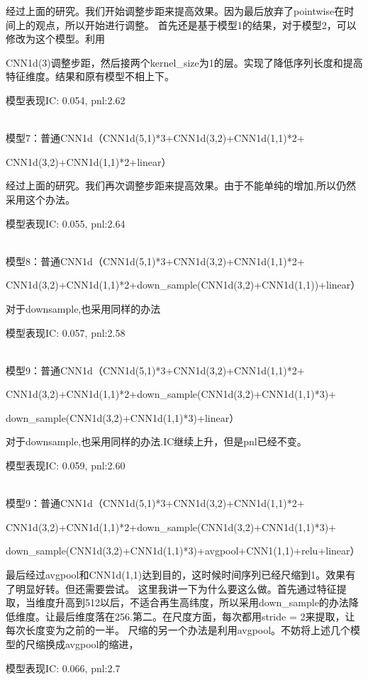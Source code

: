 \documentclass[11pt]{ctexart}
\begin{document}
经过上面的研究。我们开始调整步距来提高效果。因为最后放弃了pointwise在时间上的观点，所以开始进行调整。
首先还是基于模型1的结果，对于模型2，可以修改为这个模型。利用  \par CNN1d(3)调整步距，然后接两个kernel\_size为1的层。实现了降低序列长度和提高特征维度。结果和原有模型不相上下。

模型表现{\kaishu \small IC: 0.054, pnl:2.62}

~\\
模型7：普通CNN1d（CNN1d(5,1)*3+CNN1d(3,2)+CNN1d(1,1)*2+

CNN1d(3,2)+CNN1d(1,1)*2+linear）

经过上面的研究。我们再次调整步距来提高效果。由于不能单纯的增加,所以仍然采用这个办法。

模型表现{\kaishu \small IC: 0.055, pnl:2.64}


~\\
模型8：普通CNN1d（CNN1d(5,1)*3+CNN1d(3,2)+CNN1d(1,1)*2+

CNN1d(3,2)+CNN1d(1,1)*2+down\_sample(CNN1d(3,2)+CNN1d(1,1))+linear）

对于downsample,也采用同样的办法

模型表现{\kaishu \small IC: 0.057, pnl:2.58}


~\\
模型9：普通CNN1d（CNN1d(5,1)*3+CNN1d(3,2)+CNN1d(1,1)*2+

CNN1d(3,2)+CNN1d(1,1)*2+down\_sample(CNN1d(3,2)+CNN1d(1,1)*3)+

down\_sample(CNN1d(3,2)+CNN1d(1,1)*3)+linear）

对于downsample,也采用同样的办法.IC继续上升，但是pnl已经不变。

模型表现{\kaishu \small IC: 0.059, pnl:2.60}


~\\
模型9：普通CNN1d（CNN1d(5,1)*3+CNN1d(3,2)+CNN1d(1,1)*2+

CNN1d(3,2)+CNN1d(1,1)*2+down\_sample(CNN1d(3,2)+CNN1d(1,1)*3)+

down\_sample(CNN1d(3,2)+CNN1d(1,1)*3)+avgpool+CNN1(1,1)+relu+linear）

最后经过avgpool和CNN1d(1,1)达到目的，这时候时间序列已经尺缩到1。效果有了明显好转。但还需要尝试。
这里我讲一下为什么要这么做。首先通过特征提取，当维度升高到512以后，不适合再生高纬度，所以采用down\_sample的办法降低维度。让最后维度落在256.第二。在尺度方面，每次都用stride = 2来提取，让每次长度变为之前的一半。
尺缩的另一个办法是利用avgpool。不妨将上述几个模型的尺缩换成avgpool的缩进，

模型表现{\kaishu \small IC: 0.066, pnl:2.7}
\end{document}
